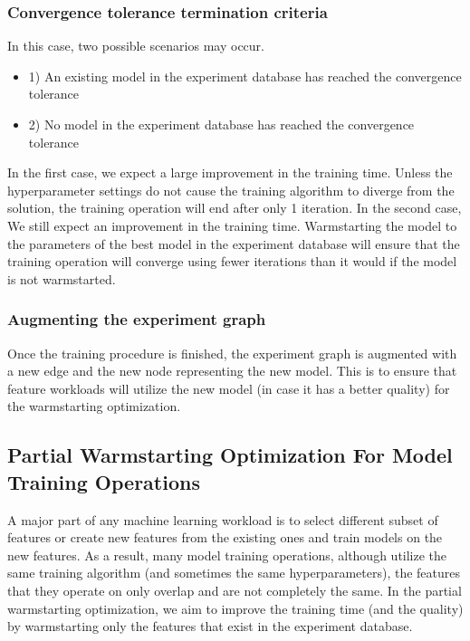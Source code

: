 \subsubsection{Convergence tolerance termination criteria}
In this case, two possible scenarios may occur.
\begin{itemize}
\item 1) An existing model in the experiment database has reached the convergence tolerance
\item 2) No model in the experiment database has reached the convergence tolerance
\end{itemize}
In the first case, we expect a large improvement in the training time. 
Unless the hyperparameter settings do not cause the training algorithm to diverge from the solution, the training operation will end after only 1 iteration.
In the second case, We still expect an improvement in the training time.
Warmstarting the model to the parameters of the best model in the experiment database will ensure that the training operation will converge using fewer iterations than it would if the model is not warmstarted.

\subsubsection{Augmenting the experiment graph}
Once the training procedure is finished, the experiment graph is augmented with a new edge and the new node representing the new model.
This is to ensure that feature workloads will utilize the new model (in case it has a better quality) for the warmstarting optimization.

\subsection{Partial Warmstarting Optimization For Model Training Operations}
A major part of any machine learning workload is to select different subset of features or create new features from the existing ones and train models on the new features.
As a result, many model training operations, although utilize the same training algorithm (and sometimes the same hyperparameters), the features that they operate on only overlap and are not completely the same.
In the partial warmstarting optimization, we aim to improve the training time (and the quality) by warmstarting only the features that exist in the experiment database.



